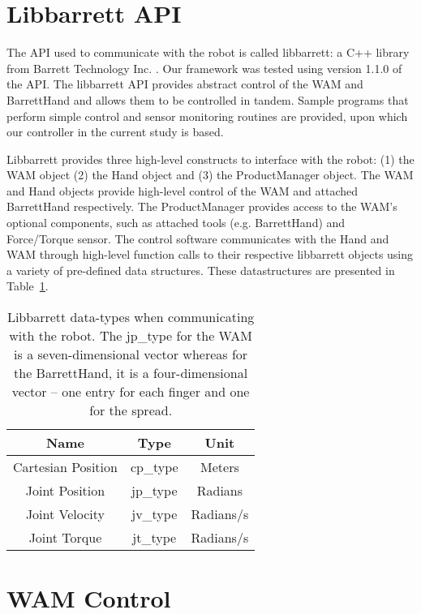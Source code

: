 \section{Libbarrett API}
\label{sec:libbarrett}

The API used to communicate with the robot is called libbarrett: a C++ library from Barrett Technology Inc. \cite{libbarrett}.
Our framework was tested using version 1.1.0 of the API.
The libbarrett API provides abstract control of the WAM and BarrettHand and allows them to be controlled in tandem.
Sample programs that perform simple control and sensor monitoring routines are provided, upon which our controller in the current study is based.

Libbarrett provides three high-level constructs to interface with the robot: (1) the WAM object (2) the Hand object and (3) the ProductManager object.
The WAM and Hand objects provide high-level control of the WAM and attached BarrettHand respectively.
The ProductManager provides access to the WAM's optional components, such as attached tools (e.g.  BarrettHand) and Force/Torque sensor.
The control software communicates with the Hand and WAM through high-level function calls to their respective libbarrett objects using a variety of pre-defined data structures. 
These datastructures are presented in Table~\ref{tbl:data_types}.

\begin{table}[h]
\centering
\begin{tabular}{| c | c | c |}
    \hline
    Name & Type & Unit \\
    \hline 
    Cartesian Position & cp\_type & Meters\\
    Joint Position & jp\_type & Radians\\
    Joint Velocity & jv\_type & Radians/s\\
    Joint Torque & jt\_type & Radians/s \\
    \hline 
\end{tabular}
\caption{Libbarrett data-types when communicating with the robot. The jp\_type for the WAM is a seven-dimensional vector whereas for the BarrettHand, it is a four-dimensional vector -- one entry for each finger and one for the spread.}
\label{tbl:data_types}
\end{table}


\section{WAM Control}

